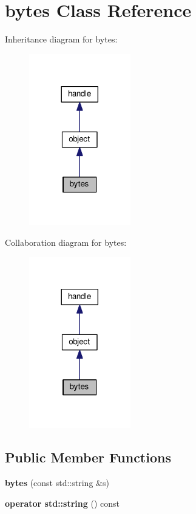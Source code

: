 \hypertarget{classbytes}{}\section{bytes Class Reference}
\label{classbytes}


Inheritance diagram for bytes\+:
\nopagebreak
\begin{figure}[H]
\begin{center}
\leavevmode
\includegraphics[width=125pt]{classbytes__inherit__graph}
\end{center}
\end{figure}


Collaboration diagram for bytes\+:
\nopagebreak
\begin{figure}[H]
\begin{center}
\leavevmode
\includegraphics[width=125pt]{classbytes__coll__graph}
\end{center}
\end{figure}
\subsection*{Public Member Functions}
\begin{DoxyCompactItemize}
\item 
{\bfseries bytes} (const std\+::string \&s)\hypertarget{classbytes_a39cb6d38b9530c023063852b013ecf50}{}\label{classbytes_a39cb6d38b9530c023063852b013ecf50}

\item 
{\bfseries operator std\+::string} () const \hypertarget{classbytes_a3e330560efc7205c68e4012027a949e3}{}\label{classbytes_a3e330560efc7205c68e4012027a949e3}

\end{DoxyCompactItemize}
